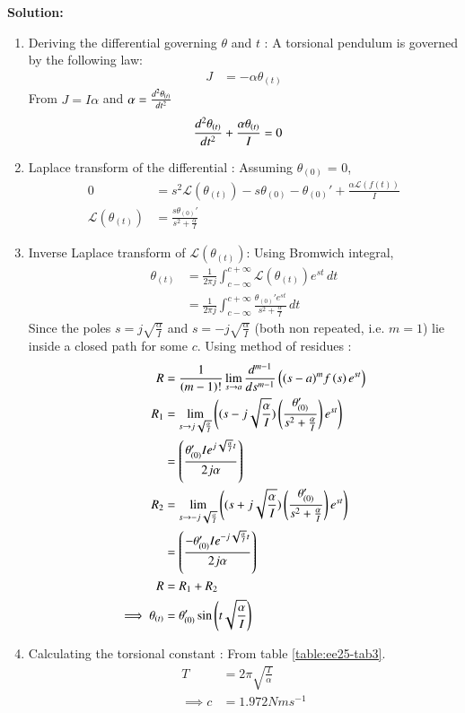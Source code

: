 \documentclass[journal,12pt,onecolumn]{IEEEtran}
\theoremstyle{remark}
\begin{document}
\textbf{Solution:}
    
\begin{enumerate}
    \item Deriving the differential governing $\theta$ and $t$ :
A torsional pendulum is governed by the following law:
\begin{align}
    J &= -\alpha\theta_{(t)} 
\end{align}
From $J = I\alpha$ and $\alpha = \dv[2]{\theta_{(t)}}{t}$
\begin{align}
\dv[2]{\theta_{(t)}}{t} + \frac{\alpha\theta_{(t)}}{I} &= 0
\end{align}
\item 
Laplace transform of the differential : 
Assuming $\theta_{(0)}$ = 0,
\begin{align}
0 &= s^2\mathscr{L}(\theta_{(t)}) - s\theta_{(0)} - \theta_{(0)}' + \frac{\alpha\mathscr{L}(f(t))}{I}\\
\mathscr{L}(\theta_{(t)}) &= \frac{s\theta_{(0)}'}{s^2+\frac{\alpha}{I}}
    \end{align}
\item Inverse Laplace transform of $\mathscr{L}(\theta_{(t)})$: Using Bromwich integral,
\begin{align}
 \theta_{(t)} &= \frac{1}{2\pi j}\int_{c-\infty}^{c+\infty}\mathscr{L}(\theta_{(t)})e^{st}\,dt\\
 &= \frac{1}{2\pi j}\int_{c-\infty}^{c+\infty}\frac{\theta_{(0)}'e^{st}}{s^2+\frac{\alpha}{I}}\,dt
\end{align}
Since the poles $s=j\sqrt{\frac{\alpha}{I}}$ and $s=-j\sqrt{\frac{\alpha}{I}}$ (both non repeated, i.e. $m=1$) lie inside a closed path for some $c$. Using method of residues :
\begin{align}
    R&=\frac{1}{\left(m-1\right)!}\lim\limits_{s\to a}\frac{d^{m-1}}{ds^{m-1}}\left({(s-a)}^{m}f\left(s\right) e^{st}\right)\\
      R_1&=\lim\limits_{s\to j\sqrt{\frac{\alpha}{I}}}\left({(s-j\sqrt{\frac{\alpha}{I}})}\left(\frac{\theta_{(0)}'}{s^2+\frac{\alpha}{I}}\right) e^{st}\right)\\
&={\left(\frac{\theta_{(0)}'Ie^{j\sqrt{\frac{\alpha}{I}}t}}{2j\alpha}\right)}\\
  R_2&=\lim\limits_{s\to -j\sqrt{\frac{\alpha}{I}}}\left({(s+j\sqrt{\frac{\alpha}{I}})}\left(\frac{\theta_{(0)}'}{s^2+\frac{\alpha}{I}}\right) e^{st}\right)\\
&={\left(\frac{-\theta_{(0)}'Ie^{-j\sqrt{\frac{\alpha}{I}}t}}{2j\alpha}\right)}\\
R &= R_1 + R_2\\
\implies
\theta_{(t)} &=\theta_{(0)}'\sin{\ensuremath{\left(t\sqrt{\frac{\alpha}{I}}\right)}}
\end{align}
\item Calculating the torsional constant :
From table \ref{table:ee25-tab3}.
\begin{align}
 T &= 2\pi\sqrt{\frac{I}{\alpha}}\\
\implies c &= 1.972 Nms^{-1}
\end{align}


\end{enumerate}
\end{document}
